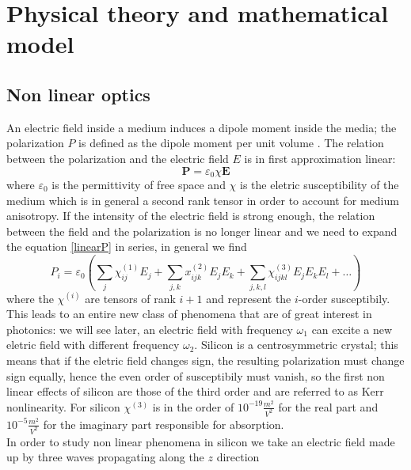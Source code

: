 \documentclass[12pt]{book}
\begin{document}

\tableofcontents




\chapter{Physical theory and mathematical model}
\section{Non linear optics}
An electric field inside a medium induces a dipole moment inside the media; the polarization $P$ is defined as the dipole moment per unit volume \cite{book:saleh}. The relation between the polarization and the electric field $E$ is in first approximation linear:
\begin{equation}\label{linearP} \mathbf{P} = \varepsilon_0 \chi \mathbf{E}
\end{equation}
where $\varepsilon_0$ is the permittivity of free space and $\chi$ is the eletric susceptibility of the medium which is in general a second rank tensor in order to account for medium anisotropy. If the intensity of the electric field is strong enough, the relation between the field and the polarization is no longer linear and we need to expand the equation \eqref{linearP} in series, in general we find
\begin{equation}\label{nonlinearpolarization}P_i  = \varepsilon_0(\sum_j \chi_{ij}^{(1)} E_j + \sum_{j,k}x_{ijk}^{(2)}E_jE_k + \sum_{j,k,l}\chi_{ijkl}^{(3)}E_jE_kE_l + \dots )\end{equation}
where the $\chi^{(i)}$ are tensors of rank $i+1$ and represent the $i$-order susceptibily. This leads to an entire new class of phenomena that are of great interest in photonics: we will see later, an electric field with frequency $\omega_1$ can excite a new eletric field with different frequency $\omega_2$. Silicon is a centrosymmetric crystal; this means that if the eletric field changes sign, the resulting polarization must change sign equally, hence the even order of susceptibily must vanish, so the first non linear effects of silicon are those of the third order and are referred to as Kerr nonlinearity. For silicon $\chi^{(3)}$ is in the order of $10^{-19} \frac{m^2}{V^2}$ for the real part and $10^{-5} \frac{m^2}{V^2}$ for the imaginary part responsible for absorption. \\
In order to study non linear phenomena in silicon we take an electric field made up by three waves propagating along the $z$ direction
\end{document}
